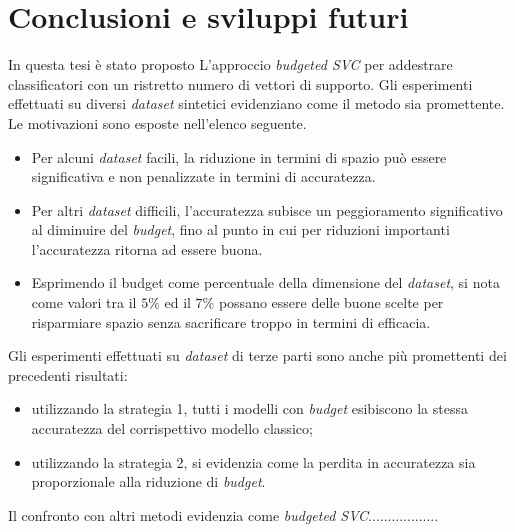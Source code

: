 \chapter{Conclusioni e sviluppi futuri}
\label{chap:conclusioni}
In questa tesi è stato proposto L'approccio \emph{budgeted SVC} per addestrare classificatori con un ristretto numero di vettori di supporto.
Gli esperimenti effettuati su diversi \emph{dataset} sintetici evidenziano come il metodo sia promettente. 
Le motivazioni sono esposte nell'elenco seguente.
\begin{itemize}
    \item Per alcuni \emph{dataset} facili, la riduzione in termini di spazio può essere significativa e non penalizzate in termini di accuratezza.
    \item Per altri \emph{dataset} difficili, l'accuratezza subisce un peggioramento significativo al diminuire del \emph{budget}, fino al punto in cui per riduzioni importanti l'accuratezza ritorna ad essere buona.
    \item Esprimendo il budget come percentuale della dimensione del \emph{dataset}, si nota come valori tra il $5\%$ ed il $7\%$ possano essere delle buone scelte per risparmiare spazio senza sacrificare troppo in termini di efficacia.
\end{itemize}

Gli esperimenti effettuati su \emph{dataset} di terze parti sono anche più promettenti dei precedenti risultati:
\begin{itemize}
    \item utilizzando la strategia 1, tutti i modelli con \emph{budget} esibiscono la stessa accuratezza del corrispettivo modello classico;
    \item utilizzando la strategia 2, si evidenzia come la perdita in accuratezza sia proporzionale alla riduzione di \emph{budget}.
\end{itemize}


Il confronto con altri metodi evidenzia come \emph{budgeted SVC}..................


